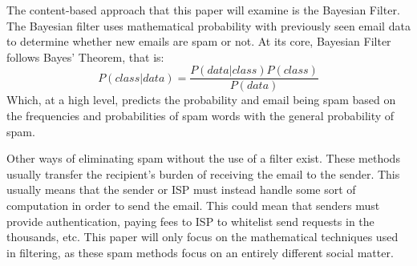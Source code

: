 \documentclass{article}
\begin{document}
\begin{paragraph}
The content-based approach that this paper will examine is the Bayesian Filter. The Bayesian filter uses mathematical probability with previously seen email data to determine whether new emails are spam or not. At its core, Bayesian Filter follows Bayes' Theorem, that is:
\begin{equation}
 P(class|data)=\frac{P(data|class)P(class)}{P(data)}
\end{equation}
Which, at a high level, predicts the probability and email being spam based on the frequencies and probabilities of spam words with the general probability of spam.
\end{paragraph}
\begin{paragraph}
Other ways of eliminating spam without the use of a filter exist. These methods usually transfer the recipient's burden of receiving the email to the sender. This usually means that the sender or ISP must instead handle some sort of computation in order to send the email. This could mean that senders must provide authentication, paying fees to ISP to whitelist send requests in the thousands, etc. This paper will only focus on the mathematical techniques used in filtering, as these spam methods focus on an entirely different social matter.
\end{paragraph}
\end{document}
